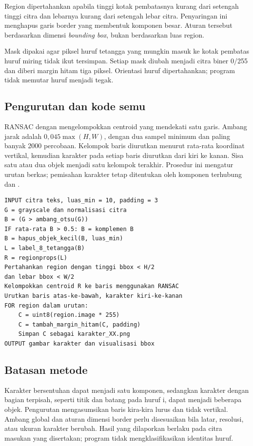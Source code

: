 Region dipertahankan apabila tinggi kotak pembatasnya kurang dari setengah
tinggi citra dan lebarnya kurang dari setengah lebar citra. Penyaringan
ini menghapus garis border yang membentuk komponen besar. Aturan tersebut
berdasarkan dimensi \emph{bounding box}, bukan berdasarkan luas region.

Mask  dipakai agar piksel huruf tetangga yang mungkin
masuk ke kotak pembatas huruf miring tidak ikut tersimpan. Setiap mask
diubah menjadi citra biner 0/255 dan diberi margin hitam tiga piksel.
Orientasi huruf dipertahankan; program tidak memutar huruf menjadi tegak.

\clearpage
\subsection{Pengurutan dan kode semu}
RANSAC dengan  mengelompokkan centroid yang mendekati
satu garis. Ambang jarak adalah \(0{,}045\max(H,W)\), dengan dua sampel
minimum dan paling banyak 2000 percobaan. Kelompok baris diurutkan menurut
rata-rata koordinat vertikal, kemudian karakter pada setiap baris diurutkan
dari kiri ke kanan. Sisa satu atau dua objek menjadi satu kelompok terakhir.
Prosedur ini mengatur urutan berkas; pemisahan karakter tetap ditentukan
oleh komponen terhubung dan .

\noindent\begin{minipage}{\textwidth}
\begin{lstlisting}[style=pseudocode,caption={Alur segmentasi karakter pada program Dustin.}]
INPUT citra teks, luas_min = 10, padding = 3
G = grayscale dan normalisasi citra
B = (G > ambang_otsu(G))
IF rata-rata B > 0.5: B = komplemen B
B = hapus_objek_kecil(B, luas_min)
L = label_8_tetangga(B)
R = regionprops(L)
Pertahankan region dengan tinggi bbox < H/2
dan lebar bbox < W/2
Kelompokkan centroid R ke baris menggunakan RANSAC
Urutkan baris atas-ke-bawah, karakter kiri-ke-kanan
FOR region dalam urutan:
    C = uint8(region.image * 255)
    C = tambah_margin_hitam(C, padding)
    Simpan C sebagai karakter_XX.png
OUTPUT gambar karakter dan visualisasi bbox
\end{lstlisting}
\end{minipage}

\subsection{Batasan metode}
Karakter bersentuhan dapat menjadi satu komponen, sedangkan karakter dengan
bagian terpisah, seperti titik dan batang pada huruf i, dapat menjadi beberapa
objek. Pengurutan mengasumsikan baris kira-kira lurus dan tidak vertikal.
Ambang global dan aturan dimensi border perlu disesuaikan bila latar,
resolusi, atau ukuran karakter berubah. Hasil yang dilaporkan berlaku pada
citra masukan yang disertakan; program tidak mengklasifikasikan identitas huruf.

